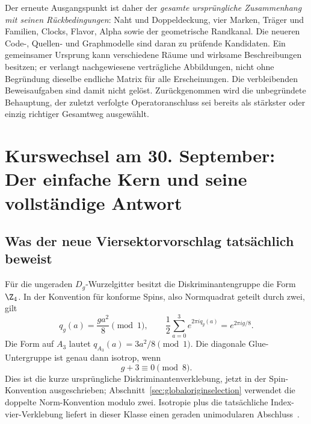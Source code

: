 Der erneute Ausgangspunkt ist daher der \emph{gesamte ursprüngliche Zusammenhang mit seinen Rückbedingungen}: Naht und Doppeldeckung, vier Marken, Träger und Familien, Clocks, Flavor, Alpha sowie der geometrische Randkanal. Die neueren Code-, Quellen- und Graphmodelle sind daran zu prüfende Kandidaten. Ein gemeinsamer Ursprung kann verschiedene Räume und wirksame Beschreibungen besitzen; er verlangt nachgewiesene verträgliche Abbildungen, nicht ohne Begründung dieselbe endliche Matrix für alle Erscheinungen. Die verbleibenden Beweisaufgaben sind damit nicht gelöst. Zurückgenommen wird die unbegründete Behauptung, der zuletzt verfolgte Operatoranschluss sei bereits als stärkster oder einzig richtiger Gesamtweg ausgewählt.

\section*{Kurswechsel am 30. September: Der einfache Kern und seine vollständige Antwort}
\label{sec:fixedpointproposalcheck}


\subsection*{Was der neue Viersektorvorschlag tatsächlich beweist}
Für die ungeraden $D_g$-Wurzelgitter besitzt die Diskriminantengruppe die Form $\Z_4$. In der Konvention für konforme Spins, also Normquadrat geteilt durch zwei, gilt
\[
 q_g(a)=\frac{ga^2}{8}\pmod1,\qquad
 \frac12\sum_{a=0}^3e^{2\pi iq_g(a)}=e^{2\pi ig/8}.
\]
Die Form auf $A_3$ lautet $q_{A_3}(a)=3a^2/8\pmod1$. Die diagonale Glue-Untergruppe ist genau dann isotrop, wenn
\[
 \boxed{g+3\equiv0\pmod8.}
\]
Dies ist die kurze ursprüngliche Diskriminantenverklebung, jetzt in der Spin-Konvention ausgeschrieben; Abschnitt~\ref{sec:globaloriginselection} verwendet die doppelte Norm-Konvention modulo zwei. Isotropie plus die tatsächliche Index-vier-Verklebung liefert in dieser Klasse einen geraden unimodularen Abschluss~\cite{nikulinforms}.

